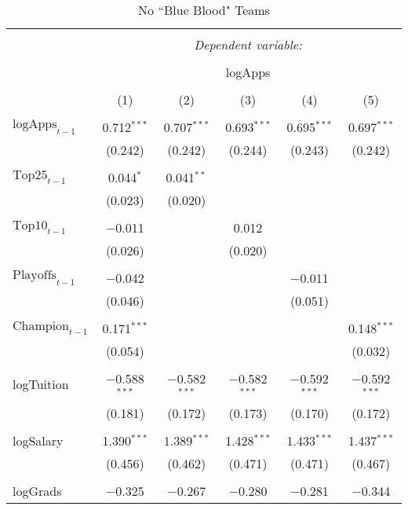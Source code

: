\documentclass[12pt,english]{article}
\begin{document}
\begin{table}[!htbp] \centering 
  \caption{No ``Blue Blood" Teams} 
  \label{} 
\begin{tabular}{@{\extracolsep{5pt}}lccccc} 
\\[-1.8ex]\hline 
\hline \\[-1.8ex] 
 & \multicolumn{5}{c}{\textit{Dependent variable:}} \\ 
\cline{2-6} 
\\[-1.8ex] & \multicolumn{5}{c}{logApps} \\ 
\\[-1.8ex] & (1) & (2) & (3) & (4) & (5)\\ 
\hline \\[-1.8ex] 
 $\text{logApps}_{t-1}$ & 0.712$^{***}$ & 0.707$^{***}$ & 0.693$^{***}$ & 0.695$^{***}$ & 0.697$^{***}$ \\ 
  & (0.242) & (0.242) & (0.244) & (0.243) & (0.242) \\ 
  & & & & & \\ 
 $\text{Top25}_{t-1}$ & 0.044$^{*}$ & 0.041$^{**}$ &  &  &  \\ 
  & (0.023) & (0.020) &  &  &  \\ 
  & & & & & \\ 
 $\text{Top10}_{t-1}$ & $-$0.011 &  & 0.012 &  &  \\ 
  & (0.026) &  & (0.020) &  &  \\ 
  & & & & & \\ 
 $\text{Playoffs}_{t-1}$ & $-$0.042 &  &  & $-$0.011 &  \\ 
  & (0.046) &  &  & (0.051) &  \\ 
  & & & & & \\ 
 $\text{Champion}_{t-1}$ & 0.171$^{***}$ &  &  &  & 0.148$^{***}$ \\ 
  & (0.054) &  &  &  & (0.032) \\ 
  & & & & & \\ 
 logTuition & $-$0.588$^{***}$ & $-$0.582$^{***}$ & $-$0.582$^{***}$ & $-$0.592$^{***}$ & $-$0.592$^{***}$ \\ 
  & (0.181) & (0.172) & (0.173) & (0.170) & (0.172) \\ 
  & & & & & \\ 
 logSalary & 1.390$^{***}$ & 1.389$^{***}$ & 1.428$^{***}$ & 1.433$^{***}$ & 1.437$^{***}$ \\ 
  & (0.456) & (0.462) & (0.471) & (0.471) & (0.467) \\ 
  & & & & & \\ 
 logGrads & $-$0.325 & $-$0.267 & $-$0.280 & $-$0.281 & $-$0.344 \\ 

\end{tabular}
\end{table}
\end{document}
